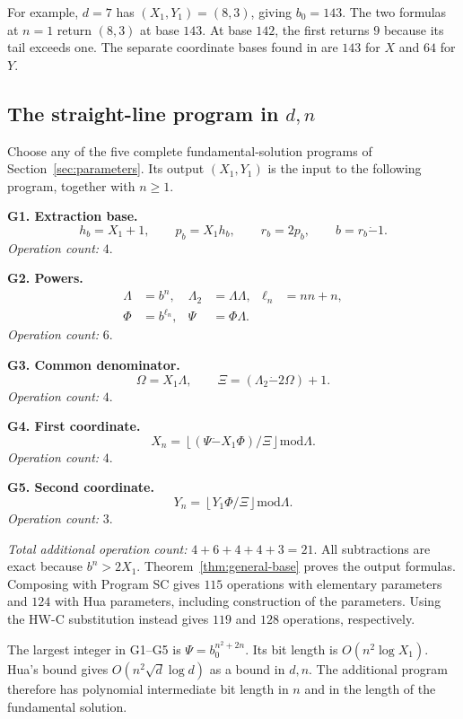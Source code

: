 \documentclass[11pt]{article}
\theoremstyle{remark}
\newcommand{\tsub}{\mathbin{\dot{-}}}
\newcommand{\md}{\mathbin{\mathrm{mod}}}
\newcommand{\fl}[1]{\left\lfloor #1\right\rfloor}
\begin{document}
For example, $d=7$ has $(X_1,Y_1)=(8,3)$, giving $b_0=143$.
The two formulas at $n=1$ return $(8,3)$ at base $143$.
At base $142$, the first returns $9$ because its tail exceeds one.
The separate coordinate bases found in \cite[Example~38]{PSA25}
are $143$ for $X$ and $64$ for $Y$.

\subsection{The straight-line program in \texorpdfstring{$d,n$}{d,n}}

Choose any of the five complete fundamental-solution programs of
Section~\ref{sec:parameters}. Its output $(X_1,Y_1)$ is the input
to the following program, together with $n\ge1$.

\textbf{G1. Extraction base.}
\[
  h_b=X_1+1,\qquad p_b=X_1h_b,\qquad
  r_b=2p_b,\qquad b=r_b\tsub1.
\]
\emph{Operation count:} $4$.

\textbf{G2. Powers.}
\begin{align*}
  \Lambda&=b^n,& \Lambda_2&=\Lambda\Lambda,& \ell_n&=nn+n,\\
  \Phi&=b^{\ell_n},& \Psi&=\Phi\Lambda.&&
\end{align*}
\emph{Operation count:} $6$.

\textbf{G3. Common denominator.}
\[
  \Omega=X_1\Lambda,\qquad
  \Xi=(\Lambda_2\tsub2\Omega)+1.
\]
\emph{Operation count:} $4$.

\textbf{G4. First coordinate.}
\[
  X_n=\fl{(\Psi\tsub X_1\Phi)/\Xi}\md\Lambda.
\]
\emph{Operation count:} $4$.

\textbf{G5. Second coordinate.}
\[
  Y_n=\fl{Y_1\Phi/\Xi}\md\Lambda.
\]
\emph{Operation count:} $3$.

\emph{Total additional operation count:} $4+6+4+4+3=21$.
All subtractions are exact because $b^n>2X_1$.
Theorem~\ref{thm:general-base} proves the output formulas.
Composing with Program SC gives $115$ operations with elementary
parameters and $124$ with Hua parameters, including construction of
the parameters. Using the HW-C substitution instead gives $119$ and
$128$ operations, respectively.

The largest integer in G1--G5 is $\Psi=b_0^{n^2+2n}$.
Its bit length is $O(n^2\log X_1)$.
Hua's bound gives $O(n^2\sqrt d\log d)$ as a bound in $d,n$.
The additional program therefore has polynomial intermediate bit length
in $n$ and in the length of the fundamental solution.

\end{document}
